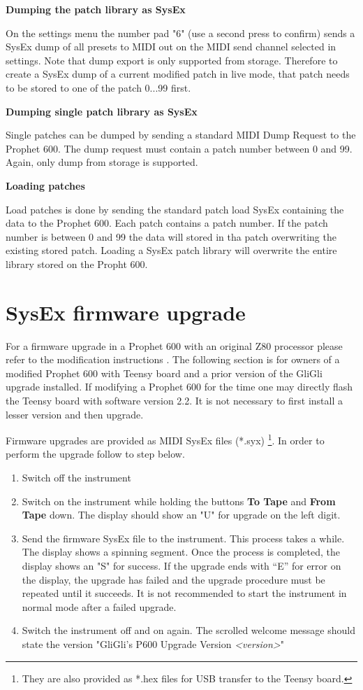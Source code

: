\documentclass[draft,landscape, 11pt, oneside]{report}
\newenvironment{flowtext}{\addmargin[0cm]{7cm}}{\endaddmargin} %
\begin{document}
\begin{flowtext}
\textbf{Dumping the patch library as SysEx} 

On the settings menu the number pad "6" (use a second press to confirm) sends a SysEx dump of all presets to MIDI out on the MIDI send channel selected in settings. Note that dump export is only supported from storage. Therefore to create a SysEx dump of a current modified patch in live mode, that patch needs to be stored to one of the patch 0...99 first.

\textbf{Dumping single patch library as SysEx} 

Single patches can be dumped by sending a standard MIDI Dump Request to the Prophet 600. The dump request must contain a patch number between 0 and 99. Again, only dump from storage is supported. 

\textbf{Loading patches} 

Load patches is done by sending the standard patch load SysEx containing the data to the Prophet 600. Each patch contains a patch number. If the patch number is  between 0 and 99 the data will stored in tha patch overwriting the existing stored patch. Loading a SysEx patch library will overwrite the entire library stored on the Propht 600.

\section{SysEx firmware upgrade}\label{fwupgrade}

For a firmware upgrade in a Prophet 600 with an original Z80 processor please refer to the modification instructions \cite{modinstructions}. The following section is for owners of a modified Prophet 600 with Teensy board and a prior version of the GliGli upgrade installed. If modifying a Prophet 600 for the time one may directly flash the Teensy board with software version 2.2. It is not necessary to first install a lesser version and then upgrade.

Firmware upgrades are provided as MIDI SysEx files (*.syx) \footnote{They are also provided as *.hex files for USB transfer to the Teensy board.}. In order to perform the upgrade follow to step below.

\begin{enumerate}
  \setlength\itemsep{0cm}
  \item Switch off the instrument
  \item Switch on the instrument while holding the buttons \textbf{To Tape} and \textbf{From Tape} down. The display should show an "U" for upgrade on the left digit.
  \item Send the firmware SysEx file to the instrument. This process takes a while. The display shows a spinning segment. Once the process is completed, the display shows an "S" for success. If the upgrade ends with “E” for error on the display, the upgrade has failed and the upgrade procedure must be repeated until it succeeds. It is not recommended to start the instrument in normal mode after a failed upgrade.
  \item Switch the instrument off and on again. The scrolled welcome message should state the version "GliGli's P600 Upgrade Version \textit{<version>}"
\end{enumerate}


\end{flowtext}
\end{document}
